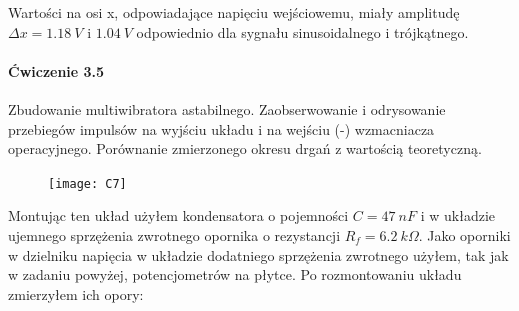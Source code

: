 \documentclass[14pt, table]{extarticle}
\begin{document}
Wartości na osi x, odpowiadające napięciu wejściowemu, miały amplitudę $\Delta x = 1.18 \ V$ i $1.04 \ V$ odpowiednio dla sygnału sinusoidalnego i trójkątnego.
\begin{figure}[H]
    \centering
    \qquad
\end{figure}

\newpage
\paragraph{Ćwiczenie 3.5 \\}
Zbudowanie multiwibratora astabilnego. Zaobserwowanie i odrysowanie przebiegów impulsów na wyjściu układu i na wejściu (-) wzmacniacza operacyjnego. Porównanie zmierzonego okresu drgań z wartością teoretyczną.

\begin{figure}[H]
\texttt{[image: C7]}
\centering
\captionsetup{labelformat=empty}
\caption{}
\end{figure}

Montując ten układ użyłem kondensatora o pojemności $C = 47 \ nF$ i w układzie ujemnego sprzężenia zwrotnego opornika o rezystancji $R_f = 6.2 \ k \Omega$. Jako oporniki w dzielniku napięcia w układzie dodatniego sprzężenia zwrotnego użyłem, tak jak w zadaniu powyżej, potencjometrów na płytce. Po rozmontowaniu układu zmierzyłem ich opory:
\end{document}
